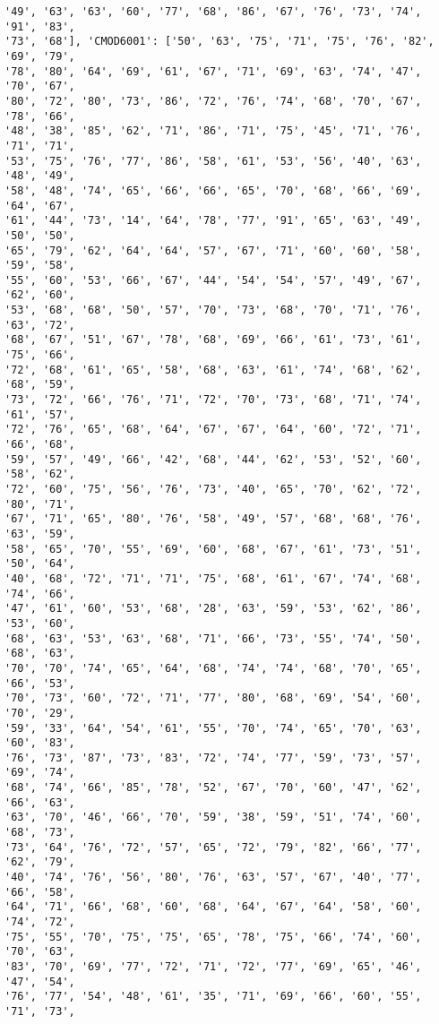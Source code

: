 \documentclass[11pt]{article}
\begin{document}
\begin{Verbatim}[commandchars=\\\{\}]
'49', '63', '63', '60', '77', '68', '86', '67', '76', '73', '74', '91', '83',
'73', '68'], 'CMOD6001': ['50', '63', '75', '71', '75', '76', '82', '69', '79',
'78', '80', '64', '69', '61', '67', '71', '69', '63', '74', '47', '70', '67',
'80', '72', '80', '73', '86', '72', '76', '74', '68', '70', '67', '78', '66',
'48', '38', '85', '62', '71', '86', '71', '75', '45', '71', '76', '71', '71',
'53', '75', '76', '77', '86', '58', '61', '53', '56', '40', '63', '48', '49',
'58', '48', '74', '65', '66', '66', '65', '70', '68', '66', '69', '64', '67',
'61', '44', '73', '14', '64', '78', '77', '91', '65', '63', '49', '50', '50',
'65', '79', '62', '64', '64', '57', '67', '71', '60', '60', '58', '59', '58',
'55', '60', '53', '66', '67', '44', '54', '54', '57', '49', '67', '62', '60',
'53', '68', '68', '50', '57', '70', '73', '68', '70', '71', '76', '63', '72',
'68', '67', '51', '67', '78', '68', '69', '66', '61', '73', '61', '75', '66',
'72', '68', '61', '65', '58', '68', '63', '61', '74', '68', '62', '68', '59',
'73', '72', '66', '76', '71', '72', '70', '73', '68', '71', '74', '61', '57',
'72', '76', '65', '68', '64', '67', '67', '64', '60', '72', '71', '66', '68',
'59', '57', '49', '66', '42', '68', '44', '62', '53', '52', '60', '58', '62',
'72', '60', '75', '56', '76', '73', '40', '65', '70', '62', '72', '80', '71',
'67', '71', '65', '80', '76', '58', '49', '57', '68', '68', '76', '63', '59',
'58', '65', '70', '55', '69', '60', '68', '67', '61', '73', '51', '50', '64',
'40', '68', '72', '71', '71', '75', '68', '61', '67', '74', '68', '74', '66',
'47', '61', '60', '53', '68', '28', '63', '59', '53', '62', '86', '53', '60',
'68', '63', '53', '63', '68', '71', '66', '73', '55', '74', '50', '68', '63',
'70', '70', '74', '65', '64', '68', '74', '74', '68', '70', '65', '66', '53',
'70', '73', '60', '72', '71', '77', '80', '68', '69', '54', '60', '70', '29',
'59', '33', '64', '54', '61', '55', '70', '74', '65', '70', '63', '60', '83',
'76', '73', '87', '73', '83', '72', '74', '77', '59', '73', '57', '69', '74',
'68', '74', '66', '85', '78', '52', '67', '70', '60', '47', '62', '66', '63',
'63', '70', '46', '66', '70', '59', '38', '59', '51', '74', '60', '68', '73',
'73', '64', '76', '72', '57', '65', '72', '79', '82', '66', '77', '62', '79',
'40', '74', '76', '56', '80', '76', '63', '57', '67', '40', '77', '66', '58',
'64', '71', '66', '68', '60', '68', '64', '67', '64', '58', '60', '74', '72',
'75', '55', '70', '75', '75', '65', '78', '75', '66', '74', '60', '70', '63',
'83', '70', '69', '77', '72', '71', '72', '77', '69', '65', '46', '47', '54',
'76', '77', '54', '48', '61', '35', '71', '69', '66', '60', '55', '71', '73',

\end{Verbatim}
\end{document}
